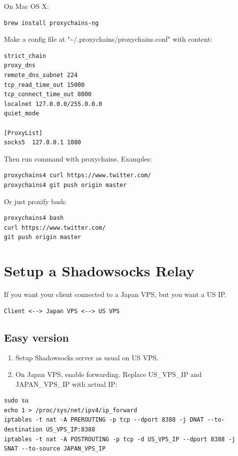 \documentclass[11pt,a4paper]{sphinxmanual}
\begin{document}
On Mac OS X:
\begin{Verbatim}
brew install proxychains-ng
\end{Verbatim}

Make a config file at "\textasciitilde{}/.proxychains/proxychains.conf" with content:

\begin{Verbatim}
strict_chain
proxy_dns 
remote_dns_subnet 224
tcp_read_time_out 15000
tcp_connect_time_out 8000
localnet 127.0.0.0/255.0.0.0
quiet_mode

[ProxyList]
socks5  127.0.0.1 1080
\end{Verbatim}

Then run command with proxychains. Examples:
\begin{Verbatim}
proxychains4 curl https://www.twitter.com/
proxychains4 git push origin master
\end{Verbatim}

Or just proxify bash:
\begin{Verbatim}
proxychains4 bash
curl https://www.twitter.com/
git push origin master
\end{Verbatim}



\section{Setup a Shadowsocks Relay}
\label{sec-6-5}
If you want your client connected to a Japan VPS, but you want a US IP.

\begin{Verbatim}
Client <--> Japan VPS <--> US VPS
\end{Verbatim}

\subsection{Easy version}
\label{sec-6-5-1}
\begin{enumerate}
\item Setup Shadowsocks server as usual on US VPS.
\item On Japan VPS, enable forwarding. Replace US\_VPS\_IP and JAPAN\_VPS\_IP with actual IP:
\end{enumerate}
\begin{Verbatim}
sudo su
echo 1 > /proc/sys/net/ipv4/ip_forward
iptables -t nat -A PREROUTING -p tcp --dport 8388 -j DNAT --to-destination US_VPS_IP:8388
iptables -t nat -A POSTROUTING -p tcp -d US_VPS_IP --dport 8388 -j SNAT --to-source JAPAN_VPS_IP
\end{Verbatim}
\end{document}
